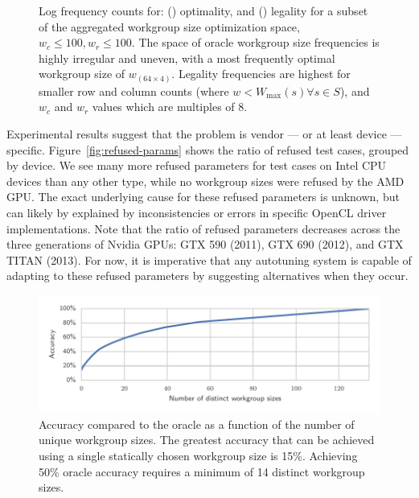 \begin{figure}
\begin{subfigure}[t]{0.45\textwidth}
    \caption{}
    \label{fig:coverage}
  \end{subfigure}
  \vspace{-.5em}
  \caption{%
    Log frequency counts for: ()
    optimality, and () legality for a subset of
    the aggregated workgroup size optimization space,
    $w_c \le 100, w_r \le 100$. The space of oracle workgroup size
    frequencies is highly irregular and uneven, with a most frequently
    optimal workgroup size of $w_{(64 \times 4)}$. Legality
    frequencies are highest for smaller row and column counts (where
    $w < W_{\max}(s) \forall s \in S$), and $w_c$ and $w_r$ values
    which are multiples of 8.%
  }
\label{fig:oracle-wgsizes}
\end{figure}

Experimental results suggest that the problem is vendor --- or at
least device --- specific. Figure~\ref{fig:refused-params} shows the
ratio of refused test cases, grouped by device. We see many more
refused parameters for test cases on Intel CPU devices than any other
type, while no workgroup sizes were refused by the AMD GPU. The exact
underlying cause for these refused parameters is unknown, but can
likely by explained by inconsistencies or errors in specific OpenCL
driver implementations. Note that the ratio of refused parameters
decreases across the three generations of Nvidia GPUs: GTX 590 (2011),
GTX 690 (2012), and GTX TITAN (2013). For now, it is imperative that
any autotuning system is capable of adapting to these refused
parameters by suggesting alternatives when they occur.

\begin{figure}
\centering
\includegraphics[width=.75\columnwidth]{img/num_params_oracle.pdf}
\caption{%
  Accuracy compared to the oracle as a function of the number of
  unique workgroup sizes. The greatest accuracy that can be achieved
  using a single statically chosen workgroup size is 15\%. Achieving
  50\% oracle accuracy requires a minimum of 14 distinct workgroup
  sizes.%
}
\label{fig:oracle-accuracy}
\end{figure}

